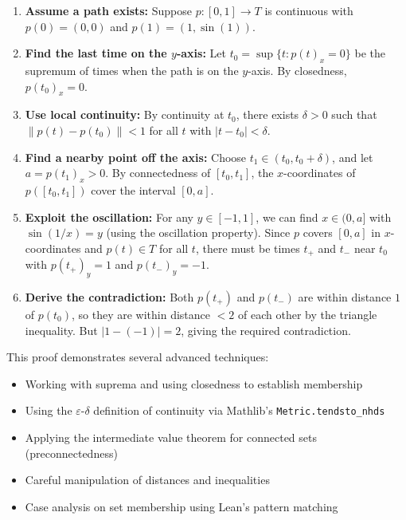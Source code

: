 \begin{enumerate}
  \item \textbf{Assume a path exists:} Suppose $p : [0, 1] \to T$ is continuous with $p(0) = (0, 0)$ and $p(1) = (1, \sin(1))$.

  \item \textbf{Find the last time on the $y$-axis:} Let $t_0 = \sup\{t : p(t)_x = 0\}$ be the supremum of times when the path is on the $y$-axis. By closedness, $p(t_0)_x = 0$.

  \item \textbf{Use local continuity:} By continuity at $t_0$, there exists $\delta > 0$ such that $\|p(t) - p(t_0)\| < 1$ for all $t$ with $|t - t_0| < \delta$.

  \item \textbf{Find a nearby point off the axis:} Choose $t_1 \in (t_0, t_0 + \delta)$, and let $a = p(t_1)_x > 0$. By connectedness of $[t_0, t_1]$, the $x$-coordinates of $p([t_0, t_1])$ cover the interval $[0, a]$.

  \item \textbf{Exploit the oscillation:} For any $y \in [-1, 1]$, we can find $x \in (0, a]$ with $\sin(1/x) = y$ (using the oscillation property). Since $p$ covers $[0, a]$ in $x$-coordinates and $p(t) \in T$ for all $t$, there must be times $t_+$ and $t_-$ near $t_0$ with $p(t_+)_y = 1$ and $p(t_-)_y = -1$.

  \item \textbf{Derive the contradiction:} Both $p(t_+)$ and $p(t_-)$ are within distance $1$ of $p(t_0)$, so they are within distance $< 2$ of each other by the triangle inequality. But $|1 - (-1)| = 2$, giving the required contradiction.
\end{enumerate}

This proof demonstrates several advanced techniques:
\begin{itemize}
  \item Working with suprema and using closedness to establish membership
  \item Using the $\varepsilon$-$\delta$ definition of continuity via Mathlib's \lstinline[language=lean]|Metric.tendsto_nhds|
  \item Applying the intermediate value theorem for connected sets (preconnectedness)
  \item Careful manipulation of distances and inequalities
  \item Case analysis on set membership using Lean's pattern matching
\end{itemize}

